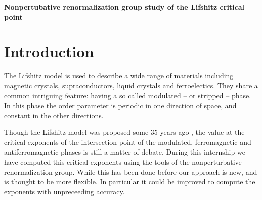 %
%

\pagebreak

\begin{center}
\Huge \textbf{Nonpertubative renormalization group study of the Lifshitz critical point}
\end{center}


\section*{\Huge{Introduction}}

The Lifshitz model is used to describe a wide range of materials including magnetic crystals, supraconductors, liquid crystals and ferroelectics. 
They share a common intriguing feature: having a so called modulated -- or stripped -- phase. In this phase the order parameter is periodic in one direction of space, and constant in the other directions. 

Though the Lifshitz model was proposed some 35 years ago \cite{Hornreich}, the value at the critical exponents of the intersection point of the modulated, ferromagnetic and antiferromagnetic phases is still a matter of debate. During this internship we have computed this critical exponents using the tools of the nonperturbative renormalization group. While this has been done before \cite{MouhannaLif} \cite{BervillierLif} our approach is new, and is thought to be more flexible. In particular it could be improved to compute the exponents with unpreceeding accuracy.


